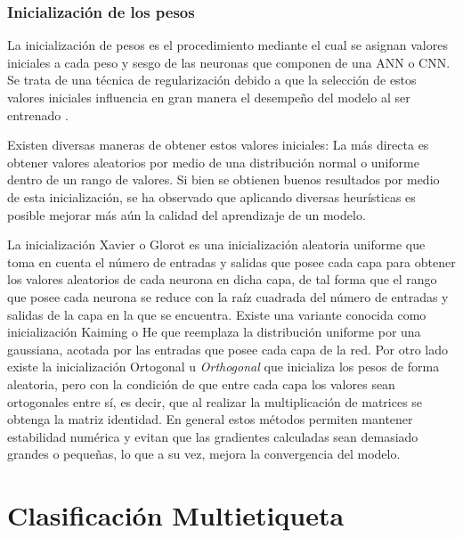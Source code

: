 \subsubsection{Inicialización de los pesos}
La inicialización de pesos es el procedimiento mediante el cual se asignan valores iniciales a cada peso y sesgo de las neuronas que componen de una ANN o CNN. Se trata de una técnica de regularización debido a que la selección de estos valores iniciales influencia en gran manera el desempeño del modelo al ser entrenado \cite{Goodfellow-et-al-2016}.

Existen diversas maneras de obtener estos valores iniciales: La más directa es obtener valores aleatorios por medio de una distribución normal o uniforme dentro de un rango de valores. Si bien se obtienen buenos resultados por medio de esta inicialización, se ha observado que aplicando diversas heurísticas es posible mejorar más aún la calidad del aprendizaje de un modelo.

La inicialización Xavier o Glorot \cite{glorot2010understanding} es una inicialización aleatoria uniforme que toma en cuenta el número de entradas y salidas que posee cada capa para obtener los valores aleatorios de cada neurona en dicha capa, de tal forma que el rango que posee cada neurona se reduce con la raíz cuadrada del número de entradas y salidas de la capa en la que se encuentra. Existe una variante conocida como inicialización Kaiming o He \cite{he2015delving} que reemplaza la distribución uniforme por una gaussiana, acotada por las entradas que posee cada capa de la red. Por otro lado existe la inicialización Ortogonal u \textit{Orthogonal} \cite{saxe_exact_2013} que inicializa los pesos de forma aleatoria, pero con la condición de que entre cada capa los valores sean ortogonales entre sí, es decir, que al realizar la multiplicación de matrices se obtenga la matriz identidad. En general estos métodos permiten mantener estabilidad numérica y evitan que las gradientes calculadas sean demasiado grandes o pequeñas, lo que a su vez, mejora la convergencia del modelo.

\FloatBarrier

\section{Clasificación Multietiqueta}
\label{section2:multilabel}

